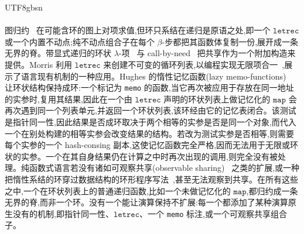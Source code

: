 \begin{CJK*}{UTF8}{gbsn}
  \paragraph{}
  \ifPaperChinese
  图归约~\cite{wadsworth1971-semantics-lambda-calculus} 在可能含环的图上对项求值,但环只系结在递归是原语之处,即一个 $\mathtt{letrec}$ 或一个内置不动点;纯不动点组合子在每个 $\beta$-步都把其函数体复制一份,展开成一条无界的脊。带显式递归的环状 $\lambda$-项~\cite{ariola1997-explicit-recursion} 与 call-by-need~\cite{ariola1997-call-by-need} 把共享作为一个附加构造来提供。Morris 利用 $\mathtt{letrec}$ 来创建不可变的循环列表,以编程实现无限项合一~\cite{morris1978-list-structures-unification},展示了语言现有机制的一种应用。Hughes 的惰性记忆函数(lazy memo-functions)~\cite{hughes1985-lazy-memo-functions} 让环状结构保持成环:一个标记为 \texttt{memo} 的函数,当它再次被应用于存放在同一地址的实参时,复用其结果,因此在一个由 $\mathtt{letrec}$ 声明的环状列表上做记忆化的 $\mathtt{map}$ 会再次遇到同一个列表单元,并返回一个环状列表,该环经由它的记忆表闭合。该测试是指针同一性,因此结果是否成环取决于两个相等的实参是否是同一个对象,而代入一个在别处构建的相等实参会改变结果的结构。若改为测试实参是否相等,则需要每个实参的一个 hash-consing 副本,这使记忆函数完全严格,因而无法用于无限或环状的实参。一个在其自身结果仍在计算之中时再次出现的调用,则完全没有被处理。纯函数式语言若没有诸如可观察共享(observable sharing)~\cite{gill2009-observable-sharing} 之类的扩展,或一种把惰性系结的环穿过数据结构的环形程序写法~\cite{bird1984-circular-programs},甚至无法观察到共享。在所有这些之中,一个在环状列表上的普通递归函数,比如一个未做记忆化的 $\mathtt{map}$,都归约成一条无界的脊,而非一个环。没有一个能让演算保持不扩展:每一个都添加了某种演算原生没有的机制,即指针同一性、$\mathtt{letrec}$、一个 \texttt{memo} 标注,或一个可观察共享组合子。
  \else

\end{CJK*}
